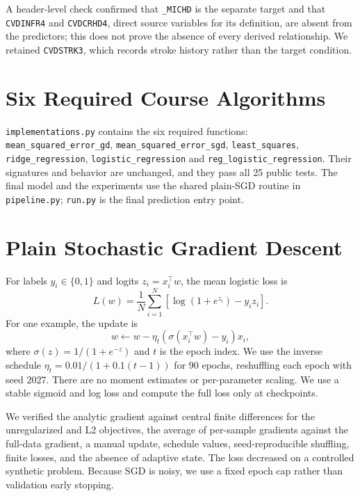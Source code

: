 \documentclass[10pt,conference,compsocconf]{IEEEtran}
\begin{document}
A header-level check confirmed that \texttt{\_MICHD} is the separate target and
that \texttt{CVDINFR4} and \texttt{CVDCRHD4}, direct source variables for its
definition, are absent from the predictors; this does not prove the absence of
every derived relationship. We retained \texttt{CVDSTRK3}, which records stroke
history rather than the target condition.

\section{Six Required Course Algorithms}
\texttt{implementations.py} contains the six required functions:
\texttt{mean\_squared\_error\_gd}, \texttt{mean\_squared\_error\_sgd},
\texttt{least\_squares}, \texttt{ridge\_regression},
\texttt{logistic\_regression} and \texttt{reg\_logistic\_regression}. Their
signatures and behavior are unchanged, and they pass all 25 public tests. The
final model and the experiments use the shared plain-SGD routine in
\texttt{pipeline.py}; \texttt{run.py} is the final prediction entry point.

\section{Plain Stochastic Gradient Descent}
For labels $y_i\in\{0,1\}$ and logits $z_i=x_i^{\top}w$, the mean logistic loss
is
\begin{equation}
L(w)=\frac1N\sum_{i=1}^{N}\left[\log(1+e^{z_i})-y_i z_i\right].
\end{equation}
For one example, the update is
\begin{equation}
w\leftarrow w-\eta_t\left(\sigma(x_i^{\top}w)-y_i\right)x_i,
\end{equation}
where $\sigma(z)=1/(1+e^{-z})$ and $t$ is the epoch index. We use the inverse
schedule $\eta_t=0.01/(1+0.1(t-1))$ for 90 epochs, reshuffling each epoch with
seed 2027. There are no moment estimates or per-parameter scaling. We use a
stable sigmoid and log loss and compute the full loss only at checkpoints.

We verified the analytic gradient against central finite differences for the
unregularized and L2 objectives, the average of per-sample gradients against
the full-data gradient, a manual update, schedule values, seed-reproducible
shuffling, finite losses, and the absence of adaptive state. The loss decreased
on a controlled synthetic problem. Because SGD is noisy, we use a fixed epoch
cap rather than validation early stopping.
\end{document}
